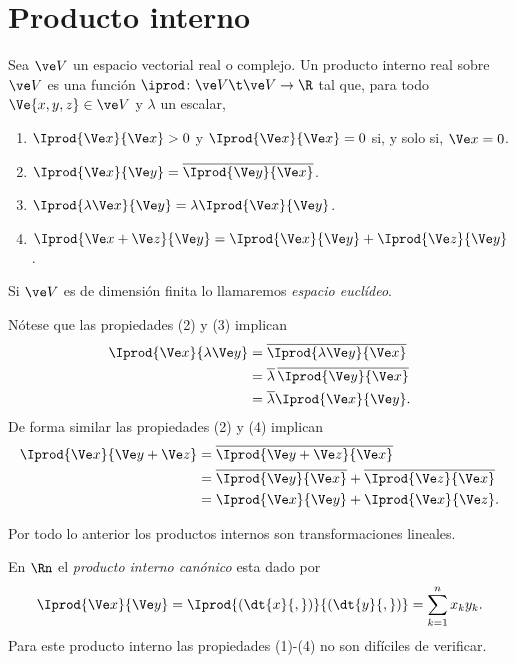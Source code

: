 \section{Producto interno}
\begin{defi}
	Sea $\ve V$ un espacio vectorial real o complejo. Un producto interno real sobre $\ve V$ es una función $\iprod\colon\ve V\t\ve V\to\R$ tal que, para todo $\Ve{x,y,z}\in\ve V$ y $\lambda$ un escalar,
	\begin{enumerate}
		\item $\Iprod{\Ve x}{\Ve x}>0$ y $\Iprod{\Ve x}{\Ve x} = 0$ si, y solo si, $\Ve x=0$.
		\item $\Iprod{\Ve x}{\Ve y} = \overline{\Iprod{\Ve y}{\Ve x}}$.
		\item $\Iprod{\lambda\Ve x}{\Ve y} = \lambda\Iprod{\Ve x}{\Ve y}$.
		\item $\Iprod{\Ve x+\Ve z}{\Ve y} = \Iprod{\Ve x}{\Ve y} + \Iprod{\Ve z}{\Ve y}$.
	\end{enumerate}
Si $\ve V$ es de dimensión finita lo llamaremos \emph{espacio euclídeo}.
\end{defi}

Nótese que las propiedades (2) y (3) implican
\begin{align*}
	\Iprod{\Ve x}{\lambda \Ve y} &= \overline{\Iprod{\lambda\Ve y}{\Ve x}} \\
						 		 &= \overline{\lambda}\,\overline{\Iprod{\Ve y}{\Ve x}} \\
						 		 &= \overline{\lambda}\Iprod{\Ve x}{\Ve y}.
\end{align*}
De forma similar las propiedades (2) y (4) implican
\begin{align*}
	\Iprod{\Ve x}{\Ve y+\Ve z} &= \overline{\Iprod{\Ve y+\Ve z}{\Ve x}} \\
							&= \overline{\Iprod{\Ve y}{\Ve x}} + \overline{\Iprod{\Ve z}{\Ve x}} \\
							&= \Iprod{\Ve x}{\Ve y} + \Iprod{\Ve x}{\Ve z}.
\end{align*}

Por todo lo anterior los productos internos son transformaciones lineales.

\begin{ejem}
	En $\Rn$ el \emph{producto interno canónico} esta dado por
	\[ \Iprod{\Ve x}{\Ve y} = \Iprod{(\dt{x}{,})}{(\dt{y}{,})} = \sum_{k=1}^{n} x_ky_k.\]
	Para este producto interno las propiedades (1)-(4) no son difíciles de verificar.
\end{ejem}

